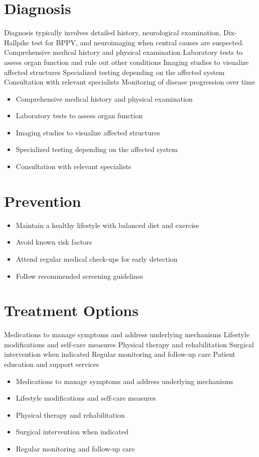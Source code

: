 \section{Diagnosis}
Diagnosis typically involves detailed history, neurological examination, Dix-Hallpike test for BPPV, and neuroimaging when central causes are suspected. Comprehensive medical history and physical examination Laboratory tests to assess organ function and rule out other conditions Imaging studies to visualize affected structures Specialized testing depending on the affected system Consultation with relevant specialists Monitoring of disease progression over time

\begin{itemize}[noitemsep]
  \item Comprehensive medical history and physical examination
  \item Laboratory tests to assess organ function
  \item Imaging studies to visualize affected structures
  \item Specialized testing depending on the affected system
  \item Consultation with relevant specialists
\end{itemize}
\section{Prevention}
\begin{itemize}[noitemsep]
  \item Maintain a healthy lifestyle with balanced diet and exercise
  \item Avoid known risk factors
  \item Attend regular medical check-ups for early detection
  \item Follow recommended screening guidelines
\end{itemize}
\section{Treatment Options}
Medications to manage symptoms and address underlying mechanisms Lifestyle modifications and self-care measures Physical therapy and rehabilitation Surgical intervention when indicated Regular monitoring and follow-up care Patient education and support services

\begin{itemize}[noitemsep]
  \item Medications to manage symptoms and address underlying mechanisms
  \item Lifestyle modifications and self-care measures
  \item Physical therapy and rehabilitation
  \item Surgical intervention when indicated
  \item Regular monitoring and follow-up care
\end{itemize}
